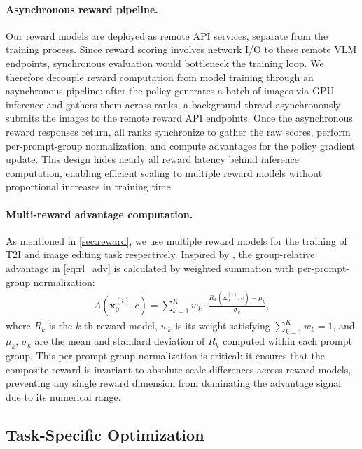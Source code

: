 \documentclass{article} %
\renewcommand{\mathbf}[1]{\bm{#1}}
\begin{document}
\paragraph{Asynchronous reward pipeline.} Our reward models are deployed as remote API services, separate from the training process. Since reward scoring involves network I/O to these remote VLM endpoints, synchronous evaluation would bottleneck the training loop. We therefore decouple reward computation from model training through an asynchronous pipeline: after the policy generates a batch of images via GPU inference and gathers them across ranks, a background thread asynchronously submits the images to the remote reward API endpoints. Once the asynchronous reward responses return, all ranks synchronize to gather the raw scores, perform per-prompt-group normalization, and compute advantages for the policy gradient update. This design hides nearly all reward latency behind inference computation, enabling efficient scaling to multiple reward models without proportional increases in training time.

\paragraph{Multi-reward advantage computation.} As mentioned in \cref{sec:reward}, we use multiple reward models for the training of T2I and image editing task respectively. Inspired by \citet{liu2026gdpo}, the group-relative advantage in \cref{eq:rl_adv} is calculated by weighted summation with per-prompt-group normalization:
\begin{align}
    A(\mathbf{x}_0^{(i)}, c) = \sum_{k=1}^{K} w_k \cdot \frac{R_k(\mathbf{x}_0^{(i)}, c) - \mu_k}{\sigma_k},
    \label{eq:reward_composition}
\end{align}
where $R_k$ is the $k$-th reward model, $w_k$ is its weight satisfying $\sum_{k=1}^K w_k=1$, and $\mu_k$, $\sigma_k$ are the mean and standard deviation of $R_k$ computed within each prompt group. This per-prompt-group normalization is critical: it ensures that the composite reward is invariant to absolute scale differences across reward models, preventing any single reward dimension from dominating the advantage signal due to its numerical range. 

\subsection{Task-Specific Optimization}
\label{sec:task_opt}
\end{document}
